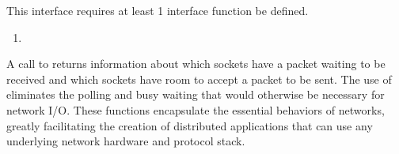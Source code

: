 This interface requires at least 1 interface function be defined.
\begin{enumerate}[noitemsep]
\item {}
\end{enumerate}

A call to  returns information about which sockets have a packet waiting to be received and which sockets have room to accept a packet to be sent.
The use of  eliminates the polling and busy waiting that would otherwise be necessary for network I/O.
These functions encapsulate the essential behaviors of networks, greatly facilitating the creation of distributed applications that can use any underlying network hardware and protocol stack.

